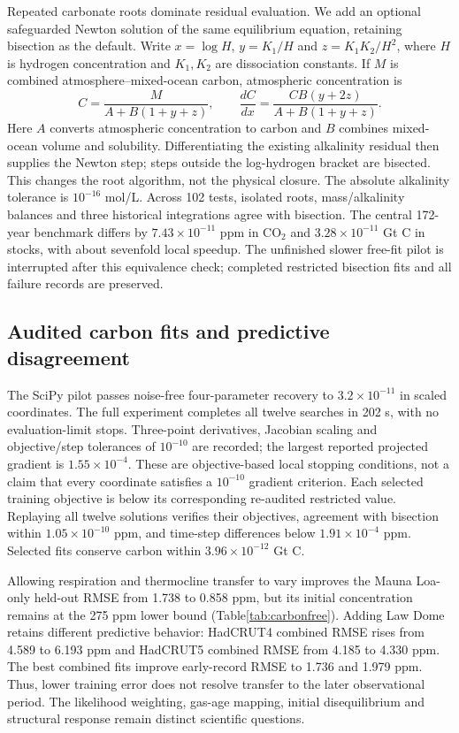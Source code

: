 Repeated carbonate roots dominate residual evaluation. We add an optional
safeguarded Newton solution of the same equilibrium equation, retaining
bisection as the default. Write $x=\log H$, $y=K_1/H$ and $z=K_1K_2/H^2$,
where $H$ is hydrogen concentration and $K_1,K_2$ are dissociation constants.
If $M$ is combined atmosphere--mixed-ocean carbon, atmospheric concentration is
\begin{equation}
 C=\frac{M}{A+B(1+y+z)},\qquad
 \frac{dC}{dx}=\frac{CB(y+2z)}{A+B(1+y+z)}.
\end{equation}
Here $A$ converts atmospheric concentration to carbon and $B$ combines mixed-
ocean volume and solubility. Differentiating the existing alkalinity residual
then supplies the Newton step; steps outside the log-hydrogen bracket are
bisected. This changes the root algorithm, not the physical closure.
The absolute alkalinity tolerance is $10^{-16}$ mol/L. Across 102 tests,
isolated roots, mass/alkalinity balances and three historical integrations
agree with bisection. The central 172-year benchmark differs by
$7.43\times10^{-11}$ ppm in CO$_2$ and $3.28\times10^{-11}$ Gt C in stocks,
with about sevenfold local speedup. The unfinished slower free-fit pilot is
interrupted after this equivalence check; completed restricted bisection fits
and all failure records are preserved.


\subsection{Audited carbon fits and predictive disagreement}
The SciPy pilot passes noise-free four-parameter recovery to
$3.2\times10^{-11}$ in scaled coordinates. The full experiment completes all
twelve searches in 202 s, with no evaluation-limit stops. Three-point derivatives,
Jacobian scaling and objective/step tolerances of $10^{-10}$ are recorded;
the largest reported projected gradient is $1.55\times10^{-4}$. These are
objective-based local stopping conditions, not a claim that every coordinate
satisfies a $10^{-10}$ gradient criterion. Each selected training objective is
below its corresponding re-audited restricted value. Replaying all twelve
solutions verifies their objectives, agreement with bisection within
$1.05\times10^{-10}$ ppm, and time-step differences below
$1.91\times10^{-4}$ ppm. Selected fits conserve carbon within
$3.96\times10^{-12}$ Gt C.

Allowing respiration and thermocline transfer to vary improves the Mauna
Loa-only held-out RMSE from 1.738 to 0.858 ppm, but its initial concentration
remains at the 275 ppm lower bound (Table\ref{tab:carbonfree}). Adding Law Dome
retains different predictive behavior: HadCRUT4 combined RMSE rises from 4.589
to 6.193 ppm and HadCRUT5 combined RMSE from 4.185 to 4.330 ppm. The best
combined fits improve early-record RMSE to 1.736 and 1.979 ppm. Thus, lower
training error does not resolve transfer to the later observational period.
The likelihood weighting, gas-age mapping, initial disequilibrium and structural
response remain distinct scientific questions.


